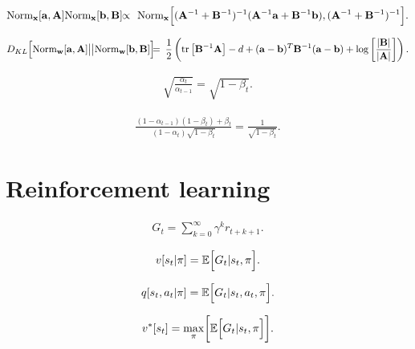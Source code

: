 \documentclass[letterpaper,twoside,openany, titlepage,oldfontcommands,titles,dvipsnames]{memoir}
\begin{document}
\begin{eqnarray}
 \mbox{Norm}_{\mathbf{x}}[\mathbf{a},\mathbf{A}]\mbox{Norm}_{\mathbf{x}}[\mathbf{b},\mathbf{B}] &\!\!
 \propto\!\! &
  \mbox{Norm}_{\mathbf{x}}\Bigl[(\mathbf{A}^{-1}+\mathbf{B}^{-1})^{-1}(\mathbf{A}^{-1}\mathbf{a}+\mathbf{B}^{-1}\mathbf{b}),(\mathbf{A}^{-1}+\mathbf{B}^{-1})^{-1} \Bigr].\nonumber\\
 \end{eqnarray}

\begin{eqnarray}
 D_{KL}\Bigl[\mbox{Norm}_{\mathbf{w}}[\mathbf{a},\mathbf{A}]\bigl|\bigr|\mbox{Norm}_{\mathbf{w}}[\mathbf{b},\mathbf{B}]\Bigr]\!\! &\!=\!&\!\!
 \frac{1}{2}\left(\mbox{tr}\left[\mathbf{B}^{-1}\mathbf{A}\right]-d+(\mathbf{a}-\mathbf{b})^{T}\mathbf{B}^{-1}(\mathbf{a}-\mathbf{b})+\log\left[\frac{
 |\mathbf{B}|}{|\mathbf{A}|}\right]\right).\nonumber\\
 \end{eqnarray}

\begin{eqnarray}
  \sqrt{\frac{\alpha_{t}}{\alpha_{t-1}}}=\sqrt{1-\beta_{t}}.
 \end{eqnarray}

\begin{eqnarray}
 \frac{(1-\alpha_{t-1})(1-\beta_{t})+\beta_{t}}{(1-\alpha_{t})\sqrt{1-\beta_{t}}} =\frac{1}{\sqrt{1-\beta_{t}}}.
 \end{eqnarray}

\chapter{Reinforcement learning}

\begin{eqnarray}
 G_{t} = \sum_{k=0}^{\infty}\gamma^{k}r_{t+k+1}.
 \end{eqnarray}

\begin{eqnarray}
 v[s_t|\pi] = \mathbb{E}\Bigl[G_{t}|s_{t},\pi\Bigr].
 \end{eqnarray}

\begin{eqnarray}
 q[s_t,a_t|\pi] = \mathbb{E}\Bigl[G_{t}|s_{t},a_{t},\pi\Bigr].
 \end{eqnarray}

\begin{eqnarray}
 v^{*}[s_{t}] = \max_{\pi}\biggl[\mathbb{E}\Bigl[G_{t}|s_{t},\pi\Bigr]\biggr].
 \end{eqnarray}
\end{document}
